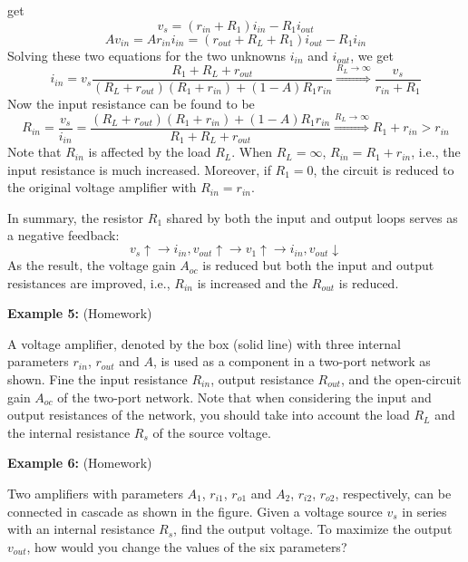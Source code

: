 \begin{itemize}
  get
  \[ v_s=(r_{in}+R_1) i_{in}-R_1 i_{out} \]
  \[ A v_{in}=Ar_{in}i_{in}=(r_{out}+R_L+R_1)i_{out}-R_1i_{in} \]
  Solving these two equations for the two unknowns $i_{in}$ and $i_{out}$,
  we get
  \[ i_{in}=v_s \frac{R_1+R_L+r_{out}}{(R_L+r_{out})(R_1+r_{in})+(1-A)R_1r_{in}}
  \stackrel{R_L\rightarrow \infty}{\Longrightarrow} \frac{v_s}{r_{in}+R_1} \]
  Now the input resistance can be found to be
  \[ R_{in}=\frac{v_s}{i_{in}}=\frac{(R_L+r_{out})(R_1+r_{in})+(1-A)R_1r_{in}}{R_1+R_L+r_{out}}
  \stackrel{R_L\rightarrow \infty}{\Longrightarrow} R_1+r_{in}>r_{in} \]  
  Note that $R_{in}$ is affected by the load $R_L$. When $R_L=\infty$,
  $R_{in}=R_1+r_{in}$, i.e., the input resistance is much increased. 
  Moreover, if $R_1=0$, the circuit is reduced to the original voltage 
  amplifier with $R_{in}=r_{in}$.
\end{itemize}
In summary, the resistor $R_1$ shared by both the input and output loops
serves as a negative feedback:
\[ v_s\uparrow \rightarrow i_{in}, v_{out}\uparrow \rightarrow v_1\uparrow 
\rightarrow i_{in}, v_{out}\downarrow \]
As the result, the voltage gain $A_{oc}$ is reduced but both the input and
output resistances are improved, i.e., $R_{in}$ is increased and the $R_{out}$
is reduced.

{\bf Example 5:} (Homework)


A voltage amplifier, denoted by the box (solid line) with three internal 
parameters $r_{in}$, $r_{out}$ and $A$, is used as a component in a two-port
network as shown. Fine the input resistance $R_{in}$, output resistance 
$R_{out}$, and the open-circuit gain $A_{oc}$ of the two-port network.
Note that when considering the input and output resistances of the network,
you should take into account the load $R_L$ and the internal resistance $R_s$
of the source voltage.


{\bf Example 6:} (Homework)


Two amplifiers with parameters $A_1$, $r_{i1}$, $r_{o1}$ and $A_2$, $r_{i2}$, 
$r_{o2}$, respectively, can be connected in cascade as shown in the figure. 
Given a voltage source $v_s$ in series with an internal resistance $R_s$,
find the output voltage. To maximize the output $v_{out}$, how would you 
change the values of the six parameters?

